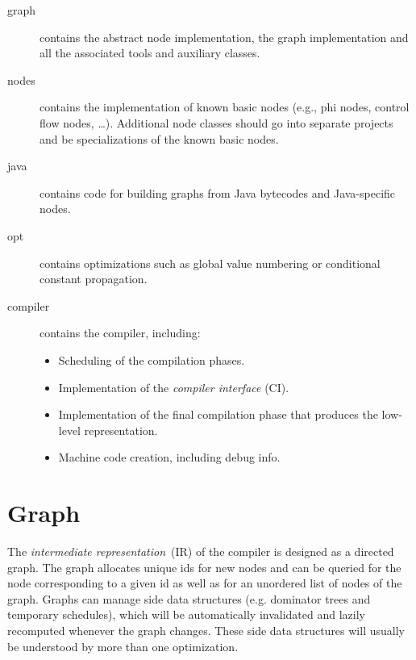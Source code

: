 \documentclass[twocolumn]{svjour3}
\begin{document}
\begin{description}
    \item[graph] contains the abstract node implementation, the graph implementation and all the associated tools and auxiliary classes.
    \item[nodes] contains the implementation of known basic nodes (e.g., phi nodes, control flow nodes, \ldots).
 				 Additional node classes should go into separate projects and be specializations of the known basic nodes.
    \item[java] contains code for building graphs from Java bytecodes and Java-specific nodes.
    \item[opt] contains optimizations such as global value numbering or conditional constant propagation.
    \item[compiler] contains the compiler, including:
        \begin{itemize}
            \item Scheduling of the compilation phases.
            \item Implementation of the \emph{compiler interface} (CI).
            \item Implementation of the final compilation phase that produces the low-level representation.
            \item Machine code creation, including debug info.
        \end{itemize}
\end{description}


\section{Graph}

The \emph{intermediate representation}~(IR) of the compiler is designed as a directed graph.
The graph allocates unique ids for new nodes and can be queried for the node corresponding to a given id as well as for an unordered list of nodes of the graph.
Graphs can manage side data structures (e.g. dominator trees and temporary schedules), which will be automatically invalidated and lazily recomputed whenever the graph changes. These side data structures will usually be understood by more than one optimization.
\end{document}
